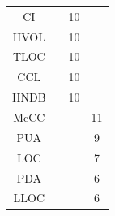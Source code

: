 \begin{table}[H]
\begin{center}
\begin{tabular}{cccc}
CI              &                      & 10              &               \\
HVOL            &                      & 10              &               \\
TLOC            &                      & 10              &               \\
CCL             &                      & 10              &               \\
HNDB            &                      & 10              &               \\
McCC            & \multicolumn{1}{l}{} &                 & 11            \\
PUA             & \multicolumn{1}{l}{} &                 & 9             \\
LOC             & \multicolumn{1}{l}{} &                 & 7             \\
PDA             & \multicolumn{1}{l}{} &                 & 6             \\
LLOC            & \multicolumn{1}{l}{} &                 & 6            
\end{tabular}
\end{center}
\end{table}